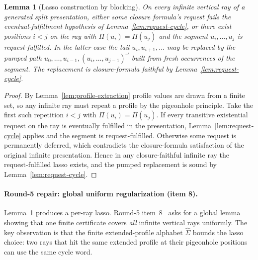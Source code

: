 \documentclass[11pt]{article}
\newtheorem{lemma}[theorem]{Lemma}
\newcommand{\extSigma}{\widehat\Sigma}
\begin{document}
\begin{lemma}[Lasso construction by blocking]\label{lem:lasso}
On every infinite vertical ray of a generated split presentation,
either some closure formula's request fails the eventual-fulfillment
hypothesis of Lemma~\ref{lem:request-cycle}, or there exist
positions $i<j$ on the ray with $\Pi(u_i)=\Pi(u_j)$ and the segment
$u_i,\ldots,u_j$ is request-fulfilled.  In the latter case the tail
$u_i,u_{i+1},\ldots$ may be replaced by the pumped path
$u_0,\ldots,u_{i-1},(u_i,\ldots,u_{j-1})^\omega$ built from fresh
occurrences of the segment.  The replacement is closure-formula
faithful by Lemma~\ref{lem:request-cycle}.
\end{lemma}

\begin{proof}
By Lemma~\ref{lem:profile-extraction} profile values are drawn from
a finite set, so any infinite ray must repeat a profile by the
pigeonhole principle.  Take the first such repetition $i<j$ with
$\Pi(u_i)=\Pi(u_j)$.  If every transitive existential request on the
ray is eventually fulfilled in the presentation,
Lemma~\ref{lem:request-cycle} applies and the segment is
request-fulfilled.  Otherwise some request is permanently deferred,
which contradicts the closure-formula satisfaction of the original
infinite presentation.  Hence in any closure-faithful infinite ray
the request-fulfilled lasso exists, and the pumped replacement is
sound by Lemma~\ref{lem:request-cycle}.
\end{proof}

\paragraph{Round-5 repair: global uniform regularization (item 8).}
Lemma~\ref{lem:lasso} produces a per-ray lasso.  Round-5
item~8~\cite{GPT55Round5Review} asks for a global lemma showing
that one finite certificate covers \emph{all} infinite vertical
rays uniformly.  The key observation is that the finite
extended-profile alphabet $\extSigma$ bounds the lasso choice:
two rays that hit the same extended profile at their pigeonhole
positions can use the same cycle word.
\end{document}
